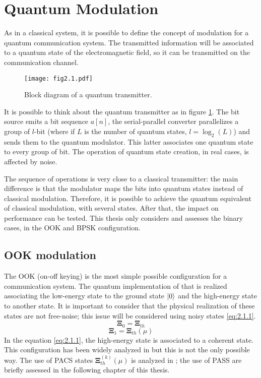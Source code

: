 \section{Quantum Modulation}
    As in a classical system, it is possible to define the concept of modulation for a 
    quantum communication system. The transmitted information will be associated to a 
    quantum state of the electromagnetic field, so it can be transmitted on the communication 
    channel.

    \begin{figure}[ht]
        \texttt{[image: fig2.1.pdf]}
        \caption{Block diagram of a quantum transmitter.}
        \label{fig:2.1}
    \end{figure}
    It is possible to think about the quantum transmitter as in figure \ref{fig:2.1}. The bit source
    emits a bit sequence $a[n]$, the serial-parallel converter parallelizes a group of $l$-bit (where
    if $L$ is the number of quantum states, $l=\log_2(L)$) and sends them to the quantum modulator.
    This latter associates one quantum state to every group of bit. The operation of quantum state 
    creation, in real cases, is affected by noise.

    The sequence of operations is very close to a classical transmitter: the main difference is that
    the modulator maps the bits into quantum states instead of classical modulation. Therefore, it is 
    possible to achieve the quantum equivalent of classical modulation, with several states. After 
    that, the impact on performance can be tested.
    This thesis only considers and assesses the binary cases, in the OOK and BPSK 
    configuration.
    
    \subsection{OOK modulation}
        The OOK (on-off keying) is the most simple possible configuration for a communication system.
        The quantum implementation of that is realized associating the low-energy state to the 
        ground state $\ket{0}$ and the high-energy state to another state. It is important to
        consider that the physical realization of these states are not free-noise; this issue will be
        considered using noisy states \ref{eq:2.1.1}.
        \begin{equation}
            \pmb{\Xi}_0 = \pmb{\Xi}_{th}
            \label{eq:2.1.1}
        \end{equation}
        \begin{equation*}
            \pmb{\Xi}_1 = \pmb{\Xi}_{th}(\mu)
        \end{equation*}
        In the equation \ref{eq:2.1.1}, the high-energy state is associated to a coherent state. This 
        configuration has been widely analyzed in \cite{helstrom1,helstrom2,coherentComm1,coherentComm2,
        coherentComm3,coherentComm4} but this is not the only possible way. The use of PACS states 
        $\pmb{\Xi}_{th}^{(k)}(\mu)$ is analyzed in \cite{PACSDisc,tesiGuerrini}; the use of PASS are briefly
        assessed in the following chapter of this thesis.

